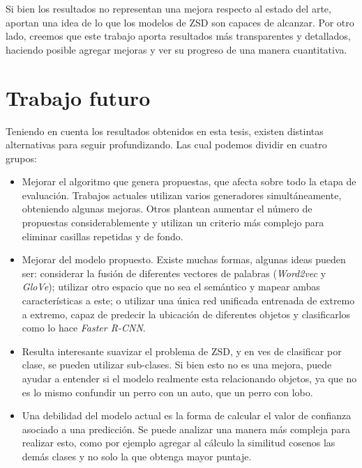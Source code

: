 Si bien los resultados no representan una mejora respecto al estado del arte, aportan una idea de lo que los modelos de ZSD son capaces de alcanzar. Por otro lado, creemos que este trabajo aporta resultados más transparentes y detallados, haciendo posible agregar mejoras y ver su progreso de una manera cuantitativa.


\section{Trabajo futuro} \label{sec:trabajo futuro}

Teniendo en cuenta los resultados obtenidos en esta tesis, existen distintas alternativas para seguir profundizando. Las cual podemos dividir en cuatro grupos:

\begin{itemize}
	\item Mejorar el algoritmo que genera propuestas, que afecta sobre todo la etapa de evaluación. Trabajos actuales utilizan varios generadores simultáneamente, obteniendo algunas mejoras. Otros plantean aumentar el número de propuestas considerablemente y utilizan un criterio más complejo para eliminar casillas repetidas y de fondo.
	\item Mejorar del modelo propuesto. Existe muchas formas, algunas ideas pueden ser: considerar la fusión de diferentes vectores de palabras (\textit{Word2vec} y \textit{GloVe}); utilizar otro espacio que no sea el semántico y mapear ambas características a este; o utilizar una única red unificada entrenada de extremo a extremo, capaz de predecir la ubicación de diferentes objetos y clasificarlos como lo hace \textit{Faster R-CNN}.
	\item Resulta interesante suavizar el problema de ZSD, y en ves de clasificar por clase, se pueden utilizar sub-clases. Si bien esto no es una mejora, puede ayudar a entender si el modelo realmente esta relacionando objetos, ya que no es lo mismo confundir un perro con un auto, que un perro con lobo.
	\item Una debilidad del modelo actual es la forma de calcular el valor de confianza asociado a una predicción. Se puede analizar una manera más compleja para realizar esto, como por ejemplo agregar al cálculo la similitud cosenos las demás clases y no solo la que obtenga mayor puntaje.
\end{itemize}

